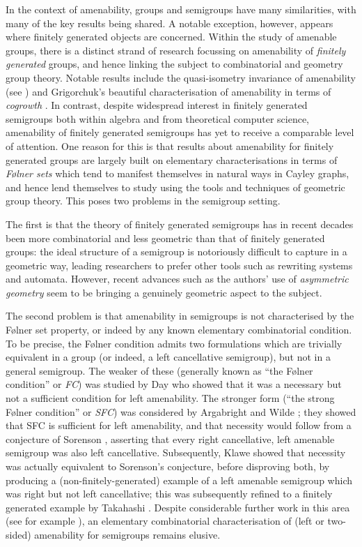 \documentclass[11pt,a4paper,reqno]{amsart}
\begin{document}
In the context of amenability, groups and semigroups have many similarities,
with many of the key results being shared.
A notable exception, however, appears where finitely generated objects are concerned. Within the study of amenable groups, there is a distinct strand of research focussing on amenability of \textit{finitely generated} groups, and hence linking the subject to combinatorial and geometry group theory. Notable results include the quasi-isometry invariance of
amenability (see \cite[Theorem 10.23]{Ghys89}) and
Grigorchuk's beautiful characterisation
of amenability in terms of
\textit{cogrowth} \cite{Grigorchuk80}.
In contrast, despite widespread interest in finitely generated semigroups both within algebra and from theoretical computer science, amenability of finitely generated semigroups has yet to receive a comparable
level of attention. 
One reason for this is that results about amenability for finitely generated groups are largely built on elementary characterisations in terms of \textit{F\o lner sets} which tend to manifest themselves in natural ways in Cayley graphs, and hence lend themselves to study using the tools and techniques of geometric group theory.  This poses two problems in the semigroup setting.

The first is that the theory of finitely generated semigroups has in 
recent decades been more combinatorial and less geometric than that of 
finitely generated groups: the ideal structure of a semigroup is 
notoriously difficult to capture in a geometric way, leading researchers 
to prefer other tools such as rewriting systems and automata. However, 
recent advances such as the authors' use of \textit{asymmetric geometry}
\cite{K_svarc, K_qsifp, K_semimetric, K_hyper}  seem to be 
bringing a genuinely geometric aspect to the subject.

The second problem is that amenability in semigroups is not characterised by the
F\o lner set property, or indeed by any known elementary combinatorial condition.  To be precise,
the F\o lner condition admits two formulations which are trivially equivalent
in a group (or indeed, a left cancellative semigroup), but not in a general
semigroup.
The weaker of these (generally known as ``the F\o lner condition'' or \textit{FC}) was
studied by Day \cite{Day57} who showed that it was a necessary but not a
sufficient condition for left amenability. The stronger form (``the
strong F\o lner condition'' or \textit{SFC}) was considered by Argabright and Wilde
\cite{Argabright67}; they showed that SFC is sufficient for left amenability,
and that necessity would follow from a conjecture of Sorenson \cite{Sorenson64,Sorenson66}, asserting
that every right cancellative, left amenable semigroup was also left
cancellative. Subsequently, Klawe \cite{Klawe77}
showed that necessity was actually equivalent
to Sorenson's conjecture, before disproving both, by producing a (non-finitely-generated)
example of a left amenable semigroup which was right but not left cancellative; this was subsequently
refined to a finitely generated example by Takahashi \cite{Takahashi03}. Despite considerable further
work in this area (see for example \cite{Yang87}), an elementary combinatorial
characterisation of (left or two-sided) amenability for semigroups remains elusive.
\end{document}
